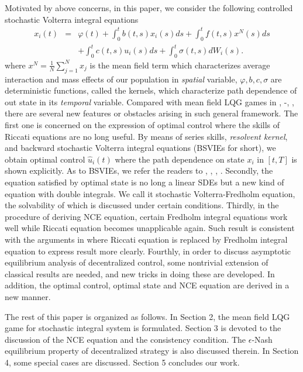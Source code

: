 \documentclass[11pt]{article}
\begin{document}
Motivated by above concerns, in this paper, we consider the following controlled stochastic
Volterra integral equations
%
\begin{eqnarray}\label{eq:1-3}
x_{i}(t)&=&\varphi(t)+\int_{0}^{t}b(t,s)x_{i}(s)ds+\int_{0}^{t}f(t,s)x^{N}(s)ds\nonumber \\
&&+\int_{0}^{t}c(t,s)u_{i}(s)ds+%
\int_{0}^{t}\sigma(t,s)dW_{i}(s).
\end{eqnarray}
%
where $x^{N}=\frac{1}{N}\sum^{N}_{j=1}x_j$ is the mean field term
which characterizes average interaction and mass effects of our
population in \emph{spatial} variable, $\varphi,b,c,\sigma$ are
deterministic functions, called the kernels, which characterize path
dependence of out state in its \emph{temporal} variable. Compared
with mean field LQG games in \cite{B 2013}, \cite{H
2010}-\cite{H-C-M 2009}, \cite{N-H 2012}, there are several new
features or obstacles arising in such general framework. The first
one is concerned on the expression of optimal control where the
skills of Riccati equations are no long useful. By means of series
skills, \emph{resolvent kernel}, and backward stochastic Volterra
integral equations (BSVIEs for short), we obtain optimal control
$\widehat{u}_i(t)$ where the path dependence on state $x_i$ in
$[t,T]$ is shown explicitly. As to BSVIEs, we refer the readers to
\cite{S-W-Y 2013}, \cite{W-S 2010}, \cite{Y 2006}, \cite{Y 2008}.
Secondly, the equation satisfied by optimal state is no long a
linear SDEs but a new kind of equation with double integrals. We
call it stochastic Volterra-Fredholm equation, the solvability of
which is discussed under certain conditions. Thirdly, in the
procedure of deriving NCE equation, certain Fredholm integral
equations work well while Riccati equation becomes unapplicable
again. Such result is consistent with the arguments in \cite{Y 1996}
where Riccati equation is replaced by Fredholm integral equation to
express result more clearly. Fourthly, in order to discuss
asymptotic equilibrium analysis of decentralized control, some
nontrivial extension of classical results are needed, and new tricks
in doing these are developed. In addition, the optimal control,
optimal state and NCE equation are derived in a new manner.

The rest of this paper is organized as follows. In Section 2, the
mean field LQG game for stochastic integral system is formulated. Section 3
is devoted to the discussion of the NCE equation and the consistency condition. The $\epsilon$-Nash equilibrium property of decentralized strategy is also discussed therein. In Section 4, some special cases are discussed. Section 5 concludes our work.
\end{document}
